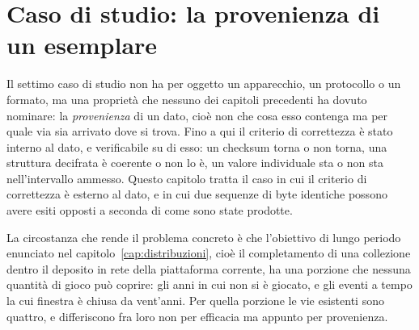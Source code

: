 
\chapter{Caso di studio: la provenienza di un esemplare}
\label{cap:provenienza}

Il settimo caso di studio non ha per oggetto un apparecchio, un protocollo o un formato, ma una proprietà che nessuno dei capitoli precedenti ha dovuto nominare: la \emph{provenienza} di un dato, cioè non che cosa esso contenga ma per quale via sia arrivato dove si trova. Fino a qui il criterio di correttezza è stato interno al dato, e verificabile su di esso: un checksum torna o non torna, una struttura decifrata è coerente o non lo è, un valore individuale sta o non sta nell'intervallo ammesso. Questo capitolo tratta il caso in cui il criterio di correttezza è esterno al dato, e in cui due sequenze di byte identiche possono avere esiti opposti a seconda di come sono state prodotte.

La circostanza che rende il problema concreto è che l'obiettivo di lungo periodo enunciato nel capitolo~\ref{cap:distribuzioni}, cioè il completamento di una collezione dentro il deposito in rete della piattaforma corrente, ha una porzione che nessuna quantità di gioco può coprire: gli anni in cui non si è giocato, e gli eventi a tempo la cui finestra è chiusa da vent'anni. Per quella porzione le vie esistenti sono quattro, e differiscono fra loro non per efficacia ma appunto per provenienza.

